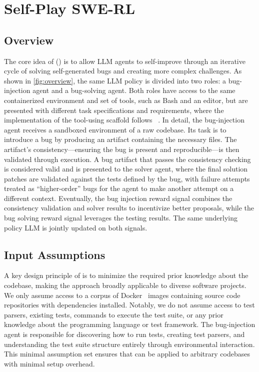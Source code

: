 \section{Self-Play SWE-RL}
\label{section:approach}

\subsection{Overview}
The core idea of \techfull (\tech) is to allow LLM agents to self-improve through an iterative cycle of solving self-generated bugs and creating more complex challenges.
As shown in \cref{fig:overview}, the same LLM policy is divided into two roles: a bug-injection agent and a bug-solving agent. Both roles have access to the same containerized environment and set of tools, such as Bash and an editor, but are presented with different task specifications and requirements,
where the implementation of the tool-using scaffold
follows \cwm~\cite{faircodegenteam2025cwmopenweightsllmresearch}.
In detail, the bug-injection agent receives a sandboxed environment of a raw codebase. Its task is to introduce a bug by producing an artifact containing the necessary files. The artifact's consistency---ensuring the bug is present and reproducible---is then validated through execution.
A bug artifact that passes the consistency checking is considered valid and is presented to the solver agent, where the final solution patches are validated against the tests defined by the bug, with failure attempts treated as ``higher-order'' bugs for the agent to make another attempt on a different context.
Eventually, the bug injection reward signal combines the consistency validation and solver results to incentivize better proposals, while the bug solving reward signal leverages the testing results.
The same underlying policy LLM is jointly updated on both signals.

\subsection{Input Assumptions}
A key design principle of \tech is to minimize the required prior knowledge about the codebase, making the approach broadly applicable to diverse software projects. We only assume access to a corpus of Docker~\cite{docker} images containing source code repositories with dependencies installed.
Notably, we do not assume access to test parsers, existing tests, commands to execute the test suite, or any prior knowledge about the programming language or test framework. The bug-injection agent is responsible for discovering how to run tests, creating test parsers, and understanding the test suite structure entirely through environmental interaction. This minimal assumption set ensures that \tech can be applied to arbitrary codebases with minimal setup overhead.


